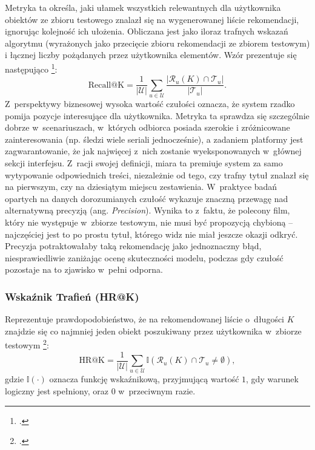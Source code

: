 Metryka ta określa, jaki ułamek wszystkich relewantnych dla użytkownika obiektów ze zbioru testowego znalazł się na wygenerowanej liście rekomendacji, ignorując kolejność ich ułożenia. Obliczana jest jako iloraz trafnych wskazań algorytmu (wyrażonych jako przecięcie zbioru rekomendacji ze zbiorem testowym) i łącznej liczby pożądanych przez użytkownika elementów. Wzór prezentuje się następująco \footcite{oliveiraRankAggregationEffective2020}:
\begin{equation}
    \text{Recall@K} = \frac{1}{|\mathcal{U}|} \sum_{u \in \mathcal{U}} \frac{|\mathcal{R}_u(K) \cap \mathcal{T}_u|}{|\mathcal{T}_u|}.
\end{equation}
Z~perspektywy biznesowej wysoka wartość czułości oznacza, że system rzadko pomija pozycje interesujące dla użytkownika. Metryka ta sprawdza się szczególnie dobrze w~scenariuszach, w~których odbiorca posiada szerokie i zróżnicowane zainteresowania (np. śledzi wiele seriali jednocześnie), a zadaniem platformy jest zagwarantowanie, że jak najwięcej z~nich zostanie wyeksponowanych w~głównej sekcji interfejsu. Z~racji swojej definicji, miara ta premiuje system za samo wytypowanie odpowiednich treści, niezależnie od tego, czy trafny tytuł znalazł się na pierwszym, czy na dziesiątym miejscu zestawienia. W~praktyce badań opartych na danych dorozumianych czułość wykazuje znaczną przewagę nad alternatywną precyzją (ang. \textit{Precision}). Wynika to z~faktu, że polecony film, który nie występuje w~zbiorze testowym, nie musi być propozycją chybioną -- najczęściej jest to po prostu tytuł, którego widz nie miał jeszcze okazji odkryć. Precyzja potraktowałaby taką rekomendację jako jednoznaczny błąd, niesprawiedliwie zaniżając ocenę skuteczności modelu, podczas gdy czułość pozostaje na to zjawisko w~pełni odporna.

\subsubsection{Wskaźnik Trafień (HR@K)}
Reprezentuje prawdopodobieństwo, że na rekomendowanej liście o~długości $K$ znajdzie się co najmniej jeden obiekt poszukiwany przez użytkownika w~zbiorze testowym \footcite{heNeuralCollaborativeFilteringKwiecien032017}:
\begin{equation}
    \text{HR@K} = \frac{1}{|\mathcal{U}|} \sum_{u \in \mathcal{U}} \mathbb{I}\left( \mathcal{R}_u(K) \cap \mathcal{T}_u \neq \emptyset \right),
\end{equation}
gdzie $\mathbb{I}(\cdot)$ oznacza funkcję wskaźnikową, przyjmującą wartość $1$, gdy warunek logiczny jest spełniony, oraz $0$ w~przeciwnym razie.

